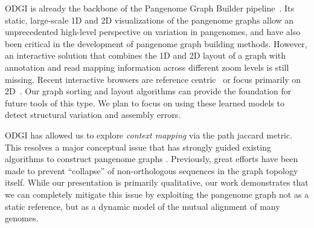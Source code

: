 \documentclass{bioinfo}
\begin{document}
ODGI is already the backbone of the Pangenome Graph Builder pipeline~\citep{pggb}.
Its static, large-scale 1D and 2D visualizations of the pangenome graphs allow an unprecedented high-level perspective on variation in pangenomes, and have also been critical in the development of pangenome graph building methods.  %
However, an interactive solution that combines the 1D and 2D layout of a graph with annotation and read mapping information across different zoom levels is still missing.
Recent interactive browsers are reference centric~\citep{Beyer2019, Yokoyama2019, Durant2021, Liang2021} or focus primarily on 2D~\citep{Wick_2015, Gonnella2018}.
Our graph sorting and layout algorithms can provide the foundation for future tools of this type.
We plan to focus on using these learned models to detect structural variation and assembly errors.

ODGI has allowed us to explore \textit{context mapping} via the path jaccard metric.
This resolves a major conceptual issue that has strongly guided existing algorithms to construct pangenome graphs \citep{Li:2020}.
Previously, great efforts have been made to prevent ``collapse'' of non-orthologous sequences in the graph topology itself.
While our presentation is primarily qualitative, our work demonstrates that we can completely mitigate this issue by exploiting the pangenome graph not as a static reference, but as a dynamic model of the mutual alignment of many genomes.


\end{document}
